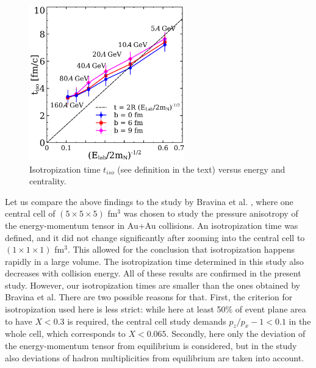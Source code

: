 \begin{figure}
  \includegraphics[width = 0.6\textwidth]{plots/thermalization_urqmd/t_x_vs_energy.pdf}
  \caption{Isotropization time $t_{iso}$ (see definition in the text) versus energy and centrality.}
  \label{FIG:t_x_energy}
\end{figure}

Let us compare the above findings to the study by Bravina et al.
\cite{Bravina:2008ra}, where one central cell of $(5 \times 5 \times 5)$ fm$^3$
was chosen to study the pressure anisotropy of the energy-momentum tensor in
Au+Au collisions. An isotropization time was  defined, and it did not change
significantly after zooming into the central cell to $(1 \times 1 \times 1)$ fm$^3$.
This allowed for the conclusion that isotropization happens rapidly in a large
volume. The isotropization time determined in this study also decreases with
collision energy. All of these results are confirmed in the present study.
However, our isotropization times are smaller than the ones obtained by Bravina
et al. There are two possible reasons for that.  First, the criterion for
isotropization used here is less strict: while here at least 50\% of
event plane area to have $X < 0.3$ is required, the central cell study demands
$p_z/p_x - 1 < 0.1$ in the whole cell, which corresponds to $X < 0.065$. Secondly,
here only the deviation of the energy-momentum tensor from equilibrium is considered,
but in the study \cite{Bravina:2008ra} also deviations of hadron multiplicities from
equilibrium are taken into account.

